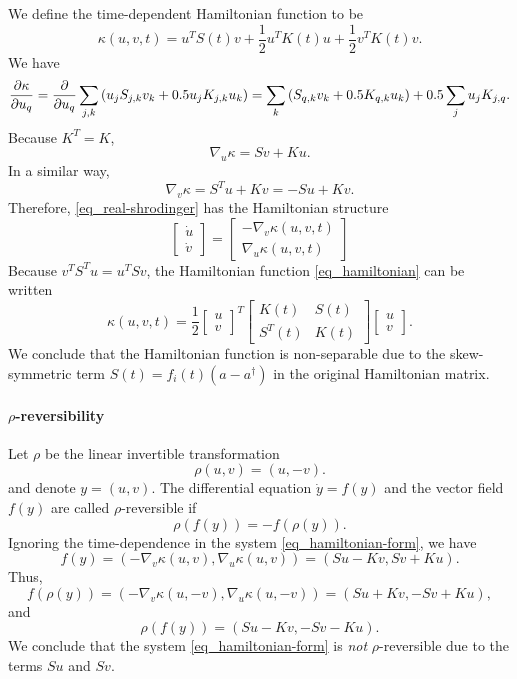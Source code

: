 \documentclass[11pt]{article}
\begin{document}
We define the time-dependent Hamiltonian function to be
\begin{equation}\label{eq_hamiltonian}
\kappa(u,v,t) = u^T S(t) v + \frac{1}{2} u^T K(t) u + \frac{1}{2} v^T K(t) v.
\end{equation}
We have
\[
\frac{\p\kappa}{\p u_q} =
%
\frac{\p}{\p u_q} \sum_{j,k} \left( u_j S_{j,k} v_k + 0.5 u_j K_{j,k} u_k \right) =
%
\sum_{k} \left( S_{q,k} v_k + 0.5 K_{q,k} u_k \right) + 0.5 \sum_{j} u_j K_{j,q}.
\]
Because $K^T = K$,
\[
\nabla_u \kappa = S v + K u.
\]
In a similar way,
\[
\nabla_v \kappa = S^T u + K v = -S u + Kv.
\]
Therefore, \eqref{eq_real-shrodinger} has the Hamiltonian structure
\begin{equation}\label{eq_hamiltonian-form}
  \begin{bmatrix}
    \dot{u} \\   \dot{v}
  \end{bmatrix} =
  \begin{bmatrix}
    -\nabla_v \kappa(u,v,t)\\
    \nabla_u \kappa(u,v,t)
  \end{bmatrix}
\end{equation}
Because $v^TS^Tu = u^TSv$, the Hamiltonian function \eqref{eq_hamiltonian} can be written
\[
\kappa(u,v,t) = \frac{1}{2} \begin{bmatrix} u \\ v \end{bmatrix}^T
%
\begin{bmatrix}
  K(t) & S(t) \\ S^T(t) & K(t)
\end{bmatrix}
\begin{bmatrix} u \\ v \end{bmatrix}.
\]
We conclude that the Hamiltonian function is non-separable due to the skew-symmetric term
$S(t) =f_i(t) ( a- a^\dag)$ in the original Hamiltonian matrix.

\paragraph{$\rho$-reversibility}
Let $\rho$ be the linear invertible transformation
\[
\rho(u,v) = (u, -v).
\]
and denote $y=(u,v)$. The differential equation $\dot{y}=f(y)$ and the vector field $f(y)$ are
called $\rho$-reversible if
\[
\rho(f(y)) = -f(\rho(y)).
\]
Ignoring the time-dependence in the system \eqref{eq_hamiltonian-form}, we have
\[
f(y) =   \left( -\nabla_v \kappa(u,v), \nabla_u \kappa(u,v) \right) = ( S u - Kv, S v + K u ).
\]
Thus,
\[
f(\rho(y)) = \left( -\nabla_v \kappa(u,-v), \nabla_u \kappa(u,-v) \right) = ( S u + Kv, -S v + K u ),
\]
and
\[
\rho(f(y)) =  ( S u - Kv, -S v - K u ).
\]
We conclude that the system \eqref{eq_hamiltonian-form} is {\em not} $\rho$-reversible due to the
terms $Su$ and $Sv$.
\end{document}
